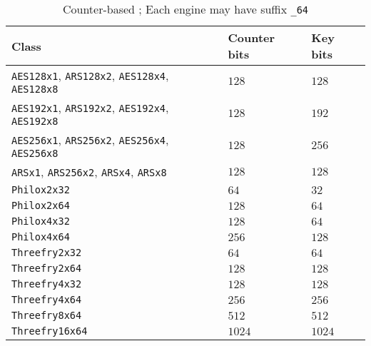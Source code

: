 \begin{table}
  \tbfigures
  \begin{tabularx}{\textwidth}{lXX}
    \toprule
    Class & Counter bits & Key bits \\
    \midrule
    \verb|AES128x1|, \verb|ARS128x2|, \verb|AES128x4|, \verb|AES128x8|
    & $128$  & $128$  \\
    \verb|AES192x1|, \verb|ARS192x2|, \verb|AES192x4|, \verb|AES192x8|
    & $128$  & $192$  \\
    \verb|AES256x1|, \verb|ARS256x2|, \verb|AES256x4|, \verb|AES256x8|
    & $128$  & $256$  \\
    \verb|ARSx1|, \verb|ARS256x2|, \verb|ARSx4|, \verb|ARSx8|
    & $128$  & $128$  \\
    \verb|Philox2x32|    & $64$   & $32$   \\
    \verb|Philox2x64|    & $128$  & $64$   \\
    \verb|Philox4x32|    & $128$  & $64$   \\
    \verb|Philox4x64|    & $256$  & $128$  \\
    \verb|Threefry2x32|  & $64$   & $64$   \\
    \verb|Threefry2x64|  & $128$  & $128$  \\
    \verb|Threefry4x32|  & $128$  & $128$  \\
    \verb|Threefry4x64|  & $256$  & $256$  \\
    \verb|Threefry8x64|  & $512$  & $512$  \\
    \verb|Threefry16x64| & $1024$ & $1024$ \\
    \bottomrule
  \end{tabularx}
  \caption{Counter-based \rng; Each \rng engine may have suffix \texttt{\_64}}
  \label{tab:Counter-based RNG}
\end{table}

